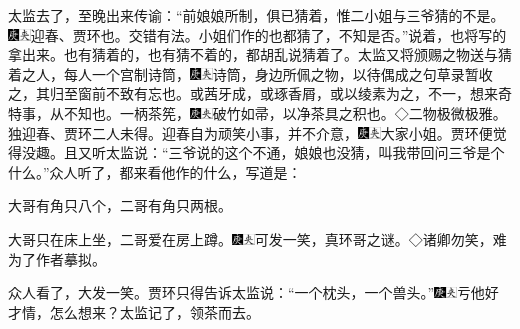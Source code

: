 太监去了，至晚出来传谕：``前娘娘所制，俱已猜着，惟二小姐与三爷猜的不是。{\includegraphics[width=3mm]{../Images/00004}\includegraphics[width=3mm]{../Images/00012}\footnotesize \kaishu 迎春、贾环也。交错有法。}小姐们作的也都猜了，不知是否。''说着，也将写的拿出来。也有猜着的，也有猜不着的，都胡乱说猜着了。太监又将颁赐之物送与猜着之人，每人一个宫制诗筒，{\includegraphics[width=3mm]{../Images/00004}\includegraphics[width=3mm]{../Images/00012}\footnotesize \kaishu 诗筒，身边所佩之物，以待偶成之句草录暂收之，其归至窗前不致有忘也。或茜牙成，或琢香屑，或以绫素为之，不一，想来奇特事，从不知也。}一柄茶筅，{\includegraphics[width=3mm]{../Images/00004}\includegraphics[width=3mm]{../Images/00012}\footnotesize \kaishu 破竹如帚，以净茶具之积也。◇二物极微极雅。}独迎春、贾环二人未得。迎春自为顽笑小事，并不介意，{\includegraphics[width=3mm]{../Images/00004}\includegraphics[width=3mm]{../Images/00012}\footnotesize \kaishu 大家小姐。}贾环便觉得没趣。且又听太监说：``三爷说的这个不通，娘娘也没猜，叫我带回问三爷是个什么。''众人听了，都来看他作的什么，写道是：

大哥有角只八个，二哥有角只两根。

大哥只在床上坐，二哥爱在房上蹲。{\includegraphics[width=3mm]{../Images/00004}\includegraphics[width=3mm]{../Images/00012}\footnotesize \kaishu 可发一笑，真环哥之谜。◇诸卿勿笑，难为了作者摹拟。}

众人看了，大发一笑。贾环只得告诉太监说：``一个枕头，一个兽头。''{\includegraphics[width=3mm]{../Images/00004}\includegraphics[width=3mm]{../Images/00012}\footnotesize \kaishu 亏他好才情，怎么想来？}太监记了，领茶而去。

